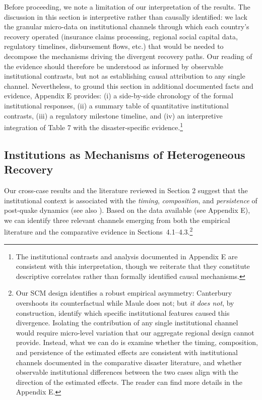 \documentclass[12pt]{article}
\begin{document}
Before proceeding, we note a limitation of our interpretation of the results. The discussion in this section is interpretive rather than causally identified: we lack the granular micro-data on institutional channels through which each country's recovery operated (insurance claims processing, regional social capital data, regulatory timelines, disbursement flows, etc.) that would be needed to decompose the mechanisms driving the divergent recovery paths. Our reading of the evidence should therefore be understood as informed by observable institutional contrasts, but not as establishing causal attribution to any single channel. Nevertheless, to ground this section in additional documented facts and evidence, Appendix E provides: (i) a side-by-side chronology of the formal institutional responses, (ii) a summary table of quantitative institutional contrasts, (iii) a regulatory milestone timeline, and (iv) an interpretive integration of Table 7 with the disaster-specific evidence.\footnote{The institutional contrasts and analysis documented in Appendix E are consistent with this interpretation, though we reiterate that they constitute descriptive correlates rather than formally identified causal mechanisms.}

\subsection{Institutions as Mechanisms of Heterogeneous Recovery}

Our cross-case results and the literature reviewed in Section 2 suggest that the institutional context is associated with the \emph{timing}, \emph{composition}, and \emph{persistence} of post-quake dynamics (see also \cite{barone2014natural, raschky2008institutions, noydupont2018longterm, loayza2012natural}). Based on the data available (see Appendix E), we can identify three relevant channels emerging from both the empirical literature and the comparative evidence in Sections~4.1–4.3.\footnote{Our SCM design identifies a robust empirical asymmetry: Canterbury overshoots its counterfactual while Maule does not; but \textit{it does not}, by construction, identify which specific institutional features caused this divergence. Isolating the contribution of any single institutional channel would require micro-level variation that our aggregate regional design cannot provide. Instead, what we can do is examine whether the timing, composition, and persistence of the estimated effects are consistent with institutional channels documented in the comparative disaster literature, and whether observable institutional differences between the two cases align with the direction of the estimated effects. The reader can find more details in the Appendix E.}
\end{document}
